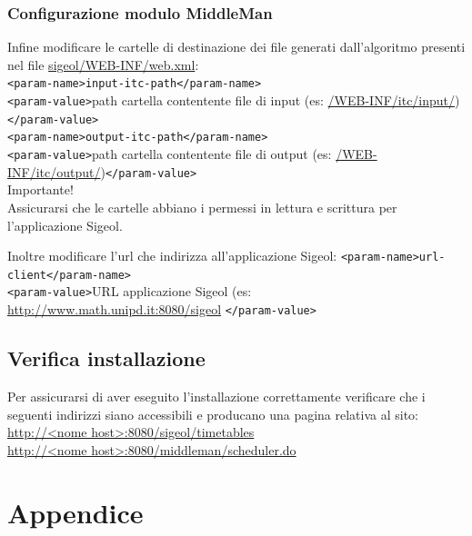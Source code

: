 \documentclass[11pt,a4paper]{article}
\begin{document}
\subsubsection{Configurazione modulo MiddleMan}
Infine modificare le cartelle di destinazione dei file generati dall'algoritmo presenti nel file \url{sigeol/WEB-INF/web.xml}:\\
\verb|<param-name>input-itc-path</param-name>|\\
\verb|<param-value>|path cartella contentente file di input (es: \url{/WEB-INF/itc/input/})\verb|</param-value>|\\
\verb|<param-name>output-itc-path</param-name>|\\
\verb|<param-value>|path cartella contentente file di output (es: \url{/WEB-INF/itc/output/})\verb|</param-value>|\\
Importante!\\
Assicurarsi che le cartelle abbiano i permessi in lettura e scrittura per l'applicazione Sigeol.

Inoltre modificare l'url che indirizza all'applicazione Sigeol:
\verb|<param-name>url-client</param-name>|\\
\verb|<param-value>|URL applicazione Sigeol (es: \url{http://www.math.unipd.it:8080/sigeol} \verb|</param-value>|\\

\subsection{Verifica installazione}
Per assicurarsi di aver eseguito l'installazione correttamente verificare che i seguenti indirizzi siano accessibili e producano una pagina relativa al sito:
\url{http://<nome host>:8080/sigeol/timetables}\\
\url{http://<nome host>:8080/middleman/scheduler.do}
\section{Appendice}
\end{document}

